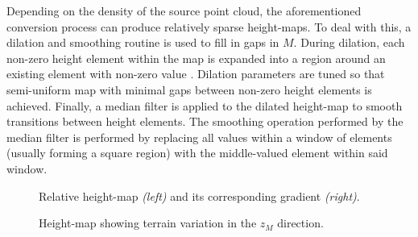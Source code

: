 			Depending on the density of the source point cloud, the aforementioned conversion process can produce relatively sparse height-maps. To deal with this, a dilation and smoothing routine is used to fill in gaps in $M$. During dilation, each non-zero height element within the map is expanded into a region around an existing element with non-zero value \cite{opencv_learn_immorph}. Dilation parameters are tuned so that semi-uniform map with minimal gaps between non-zero height elements is achieved. Finally, a median filter is applied to the dilated height-map to smooth transitions between height elements. The smoothing operation performed by the median filter is performed by replacing all values within a window of elements (usually forming a square region) with the middle-valued element within said window.
				\begin{figure}[t!]
					\centering
					\caption{Relative height-map \emph{(left)} and its corresponding gradient \emph{(right)}.}
					\label{fig::heightmap_terrain_patch}
				\end{figure}
				\begin{figure}[!h]
					\centering
					\caption{Height-map showing terrain variation in the $z_{M}$ direction.}
					\label{fig::heightmap_terrain_patch_ortho}
				\end{figure}							
